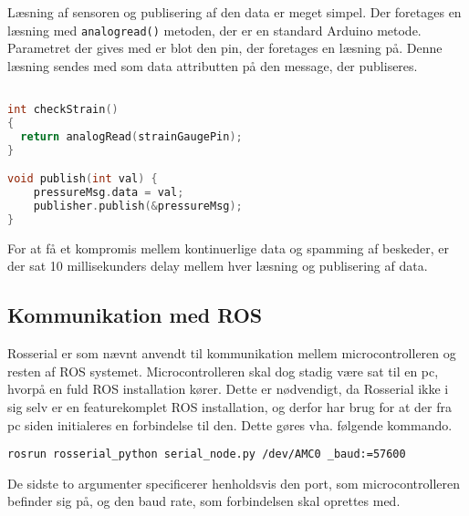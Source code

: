Læsning af sensoren og publisering af den data er meget simpel. Der foretages en læsning med \texttt{analogread()} metoden, der er en standard Arduino metode. Parametret der gives med er blot den pin, der foretages en læsning på. 
Denne læsning sendes med som data attributten på den message, der publiseres. 

\begin{lstlisting}[language=C]

int checkStrain()
{
  return analogRead(strainGaugePin);
}

void publish(int val) {
	pressureMsg.data = val;
	publisher.publish(&pressureMsg);
}

\end{lstlisting}

For at få et kompromis mellem kontinuerlige data og spamming af beskeder, er der sat 10 millisekunders delay mellem hver læsning og publisering af data. 

\subsection{Kommunikation med ROS}
Rosserial er som nævnt anvendt til kommunikation mellem microcontrolleren og resten af ROS systemet. Microcontrolleren skal dog stadig være sat til en pc, hvorpå en fuld ROS installation kører. Dette er nødvendigt, da Rosserial ikke i sig selv er en featurekomplet ROS installation, og derfor har brug for at der fra pc siden initialeres en forbindelse til den. Dette gøres vha. følgende kommando. 

	\texttt{rosrun rosserial\_python serial\_node.py /dev/AMC0 \_baud:=57600}
	
	De sidste to argumenter specificerer henholdsvis den port, som microcontrolleren befinder sig på, og den baud rate, som forbindelsen skal oprettes med.











